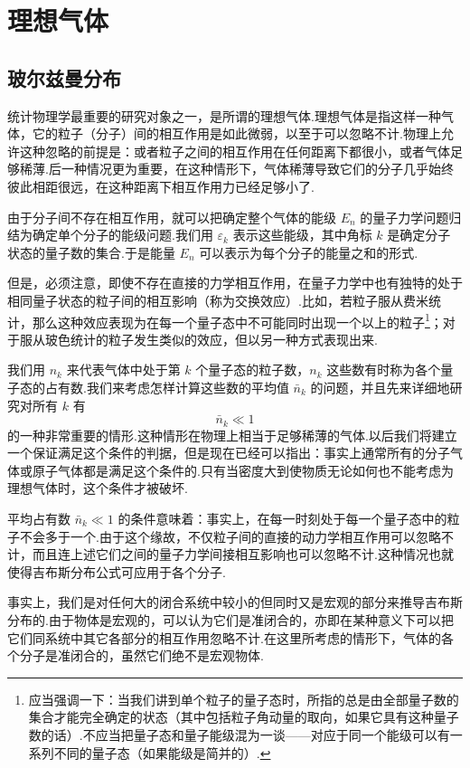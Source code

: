 \chapter{理想气体}

\section{玻尔兹曼分布}

统计物理学最重要的研究对象之一，是所谓的理想气体.理想气体是指这样一种气体，它的粒子（分子）间的相互作用是如此微弱，以至于可以忽略不计.物理上允许这种忽略的前提是：或者粒子之间的相互作用在任何距离下都很小，或者气体足够稀薄.后一种情况更为重要，在这种情形下，气体稀薄导致它们的分子几乎始终彼此相距很远，在这种距离下相互作用力已经足够小了.

由于分子间不存在相互作用，就可以把确定整个气体的能级 $E_n$ 的量子力学问题归结为确定单个分子的能级问题.我们用 $\varepsilon_k$ 表示这些能级，其中角标 $k$ 是确定分子状态的量子数的集合.于是能量 $E_n$ 可以表示为每个分子的能量之和的形式.

但是，必须注意，即使不存在直接的力学相互作用，在量子力学中也有独特的处于相同量子状态的粒子间的相互影响（称为交换效应）.比如，若粒子服从费米统计，那么这种效应表现为在每一个量子态中不可能同时出现一个以上的粒子\footnote{应当强调一下：当我们讲到单个粒子的量子态时，所指的总是由全部量子数的集合才能完全确定的状态（其中包括粒子角动量的取向，如果它具有这种量子数的话）.不应当把量子态和量子能级混为一谈——对应于同一个能级可以有一系列不同的量子态（如果能级是简并的）.}；对于服从玻色统计的粒子发生类似的效应，但以另一种方式表现出来.

我们用 $n_k$ 来代表气体中处于第 $k$ 个量子态的粒子数，$n_k$ 这些数有时称为各个量子态的占有数.我们来考虑怎样计算这些数的平均值 $\bar{n}_k$ 的问题，并且先来详细地研究对所有 $k$ 有
\begin{equation}
  \bar{n}_k\ll1
\end{equation}
的一种非常重要的情形.这种情形在物理上相当于足够稀薄的气体.以后我们将建立一个保证满足这个条件的判据，但是现在已经可以指出：事实上通常所有的分子气体或原子气体都是满足这个条件的.只有当密度大到使物质无论如何也不能考虑为理想气体时，这个条件才被破坏.

平均占有数 $\bar{n}_k\ll1$ 的条件意味着：事实上，在每一时刻处于每一个量子态中的粒子不会多于一个.由于这个缘故，不仅粒子间的直接的动力学相互作用可以忽略不计，而且连上述它们之间的量子力学间接相互影响也可以忽略不计.这种情况也就使得吉布斯分布公式可应用于各个分子.

事实上，我们是对任何大的闭合系统中较小的但同时又是宏观的部分来推导吉布斯分布的.由于物体是宏观的，可以认为它们是准闭合的，亦即在某种意义下可以把它们同系统中其它各部分的相互作用忽略不计.在这里所考虑的情形下，气体的各个分子是准闭合的，虽然它们绝不是宏观物体.

